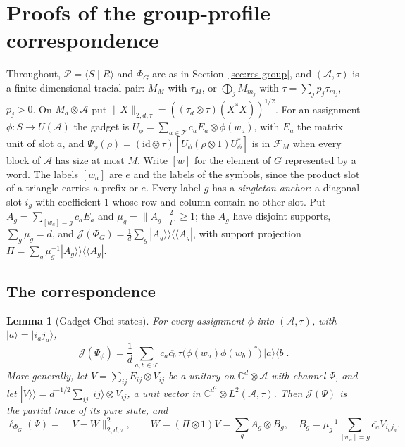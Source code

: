 \documentclass[11pt,a4paper]{article}
\theoremstyle{plain}
\newtheorem{lemma}[theorem]{Lemma}
\theoremstyle{definition}
\theoremstyle{remark}
\begin{document}
\section{Proofs of the group-profile correspondence}\label{sec:group-channels}

Throughout, $\mathcal P=\langle S\mid R\rangle$ and $\Phi_G$ are as in Section~\ref{sec:res-group}, and $(\mathcal A,\tau)$ is a finite-dimensional tracial pair: $M_M$ with
$\tau_M$, or $\bigoplus_jM_{m_j}$ with $\tau=\sum_jp_j\tau_{m_j}$, $p_j>0$. On $M_d\otimes\mathcal A$ put $\|X\|_{2,d,\tau}=((\tau_d\otimes\tau)(X^*X))^{1/2}$. For an
assignment $\phi:S\to U(\mathcal A)$ the gadget is $U_\phi=\sum_{a\in\mathcal T}c_aE_a\otimes\phi(w_a)$, with $E_a$ the matrix unit of slot $a$, and
$\Psi_\phi(\rho)=(\mathrm{id}\otimes\tau)[U_\phi(\rho\otimes1)U_\phi^*]$ is in $\mathcal F_M$ when every block of $\mathcal A$ has size at most $M$. Write $[w]$ for the element
of $G$ represented by a word. The labels $[w_a]$ are $e$ and the labels of the symbols, since the product slot of a triangle carries a prefix or
$e$. Every label $g$ has a \emph{singleton anchor}: a diagonal slot $i_g$ with coefficient $1$ whose row and column contain no other slot. Put
$A_g=\sum_{[w_a]=g}c_aE_a$ and $\mu_g=\|A_g\|_F^2\ge1$; the $A_g$ have disjoint supports, $\sum_g\mu_g=d$, and
$\mathcal J(\Phi_G)=\frac1d\sum_g|A_g\rangle\!\rangle\langle\!\langle A_g|$, with support projection $\Pi=\sum_g\mu_g^{-1}|A_g\rangle\!\rangle\langle\!\langle A_g|$.

\subsection{The correspondence}

\begin{lemma}[Gadget Choi states]\label{lem:gadget-choi}
For every assignment $\phi$ into $(\mathcal A,\tau)$, with $|a\rangle=|i_aj_a\rangle$,
\[
\mathcal J(\Psi_\phi)=\frac1d\sum_{a,b\in\mathcal T}c_a\overline{c_b}\,\tau\big(\phi(w_a)\phi(w_b)^*\big)\,|a\rangle\langle b| .
\]
More generally, let $V=\sum_{ij}E_{ij}\otimes V_{ij}$ be a unitary on $\mathbb C^d\otimes\mathcal A$ with channel $\Psi$, and let
$|V\rangle\!\rangle=d^{-1/2}\sum_{ij}|ij\rangle\otimes V_{ij}$, a unit vector in $\mathbb C^{d^2}\otimes L^2(\mathcal A,\tau)$. Then $\mathcal J(\Psi)$ is the partial trace of its
pure state, and
\[
\ell_{\Phi_G}(\Psi)=\|V-W\|_{2,d,\tau}^2,\qquad W=(\Pi\otimes1)V=\sum_gA_g\otimes B_g,\quad B_g=\mu_g^{-1}\sum_{[w_a]=g}\overline{c_a}V_{i_aj_a}.
\]
\end{lemma}
\end{document}
